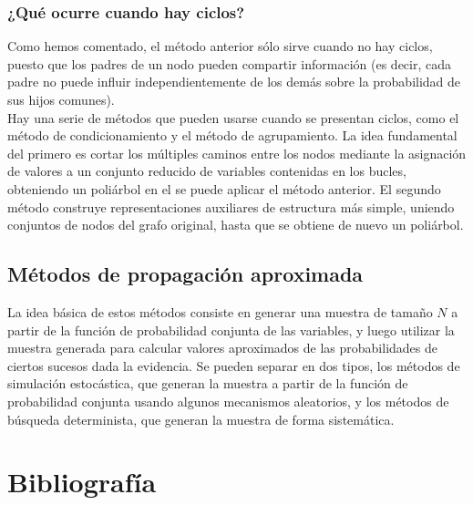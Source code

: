 \documentclass{article}
\begin{document}
\subsubsection{¿Qué ocurre cuando hay ciclos?}
Como hemos comentado, el método anterior sólo sirve cuando no hay ciclos, puesto que los padres de un nodo pueden compartir información (es decir, cada padre no puede influir independientemente de los demás sobre la probabilidad de sus hijos comunes).\\
Hay una serie de métodos que pueden usarse cuando se presentan ciclos, como el método de condicionamiento y el método de agrupamiento. La idea fundamental del primero es cortar los múltiples caminos entre los nodos mediante la asignación de valores a un conjunto reducido de variables contenidas en los bucles, obteniendo un poliárbol en el se puede aplicar el método anterior. El segundo método construye representaciones auxiliares de estructura más simple, uniendo conjuntos de nodos del grafo original, hasta que se obtiene de nuevo un poliárbol.

\subsection{Métodos de propagación aproximada}

La idea básica de estos métodos consiste en generar una muestra de tamaño $N$ a partir de la función de probabilidad conjunta de las variables, y luego utilizar la muestra generada para calcular valores aproximados de las probabilidades de ciertos sucesos dada la evidencia. Se pueden separar en dos tipos, los métodos de simulación estocástica, que generan la muestra a partir de la función de probabilidad conjunta usando algunos mecanismos aleatorios, y los métodos de búsqueda determinista, que generan la muestra de forma sistemática.

\section{Bibliografía}
\end{document}
